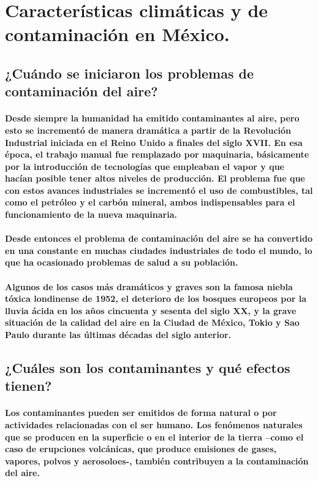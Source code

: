 \section{Características climáticas y de contaminación en México.}
  \subsection{¿Cuándo se iniciaron los problemas de contaminación del aire?}
    \paragraph {Desde siempre la humanidad ha emitido contaminantes al aire, pero esto se incrementó de manera dramática a partir de la Revolución Industrial iniciada en el Reino Unido a finales del siglo XVII. En esa época, el trabajo manual fue remplazado por maquinaria, básicamente por la introducción de tecnologías que empleaban el vapor y que hacían posible tener altos niveles de producción. El problema fue que con estos avances industriales se incrementó el  uso de combustibles, tal como el petróleo y el carbón mineral, ambos indispensables para el funcionamiento de la nueva maquinaria.}

    \paragraph {Desde entonces el problema de contaminación del aire se ha convertido en una constante en muchas ciudades industriales de todo el mundo, lo que ha ocasionado problemas de salud a su población.}

    \paragraph {Algunos de los casos más dramáticos y graves son la famosa niebla tóxica londinense de 1952, el deterioro de los bosques europeos por la lluvia ácida en los años cincuenta y sesenta del siglo XX, y la grave situación de la calidad del aire en la Ciudad de México, Tokio y Sao Paulo durante las últimas décadas del siglo anterior. }

  \subsection {¿Cuáles son los contaminantes y qué efectos tienen?}
    \paragraph {Los contaminantes pueden ser emitidos de forma natural o por actividades relacionadas con el ser humano. Los fenómenos naturales que se producen en la superficie o  en el interior de la tierra –como el caso de erupciones volcánicas, que produce emisiones de gases, vapores, polvos y aerosoloes-, también contribuyen a la contaminación del aire.}
    
